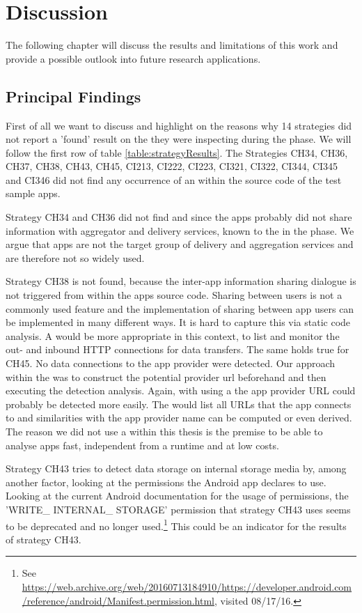 \section{Discussion}

The following chapter will discuss the results and limitations of this work and provide a possible outlook into future research applications.

\subsection{Principal Findings}

First of all we want to discuss and highlight on the reasons why 14 strategies did not report a 'found' result on the \ipr they were inspecting during the \sca phase.
We will follow the first row of table \ref{table:strategyResults}.
The Strategies CH34, CH36, CH37, CH38, CH43, CH45, CI213, CI222, CI223, CI321, CI322, CI344, CI345 and CI346 did not find any occurrence of an \ipr within the source code of the test sample apps.

Strategy CH34 and CH36 did not find and \ipr since the apps probably did not share information with aggregator and delivery services, known to the \aiprat in the \ml phase.
We argue that \mH apps are not the target group of delivery and aggregation services and are therefore not so widely used.

Strategy CH38 is not found, because the inter-app information sharing dialogue is not triggered from within the apps source code. 
Sharing between users is not a commonly used feature and the implementation of sharing between app users can be implemented in many different ways.
It is hard to capture this \ipr via static code analysis.
A \dca would be more appropriate in this context, to list and monitor the out- and inbound HTTP connections for data transfers.
The same holds true for CH45.
No data connections to the app provider were detected. 
Our approach within the \aiprat was to construct the potential provider url beforehand and then executing the detection analysis.
Again, with using a \dca the app provider URL could probably be detected more easily.
The \dca would list all URLs that the app connects to and similarities with the app provider name can be computed or even derived.
The reason we did not use a \dca within this thesis is the premise to be able to analyse \mH apps fast, independent from a runtime and at low costs.

Strategy CH43 tries to detect data storage on internal storage media by, among another factor, looking at the permissions the Android app declares to use.
Looking at the current Android documentation for the usage of permissions, the 'WRITE\_ INTERNAL\_ STORAGE' permission that strategy CH43 uses seems to be deprecated and no longer used.\footnote{\raggedright See \url{https://web.archive.org/web/20160713184910/https://developer.android.com/reference/android/Manifest.permission.html}, visited 08/17/16.}
This could be an indicator for the results of strategy CH43.

